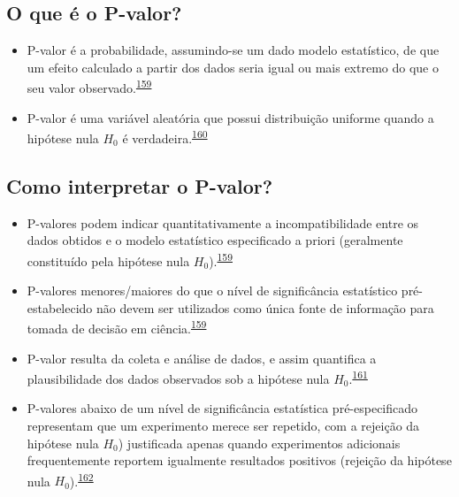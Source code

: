 \documentclass[
  a4paper,
]{book}
\begin{document}
\hypertarget{o-que-uxe9-o-p-valor}{%
\subsection{O que é o P-valor?}\label{o-que-uxe9-o-p-valor}}

\begin{itemize}
\item
  P-valor é a probabilidade, assumindo-se um dado modelo estatístico, de que um efeito calculado a partir dos dados seria igual ou mais extremo do que o seu valor observado.\textsuperscript{\protect\hyperlink{ref-wasserstein2016}{159}}
\item
  P-valor é uma variável aleatória que possui distribuição uniforme quando a hipótese nula \(H_{0}\) é verdadeira.\textsuperscript{\protect\hyperlink{ref-altman2017}{160}}
\end{itemize}

\hypertarget{como-interpretar-o-p-valor}{%
\subsection{Como interpretar o P-valor?}\label{como-interpretar-o-p-valor}}

\begin{itemize}
\item
  P-valores podem indicar quantitativamente a incompatibilidade entre os dados obtidos e o modelo estatístico especificado a priori (geralmente constituído pela hipótese nula \(H_{0}\)).\textsuperscript{\protect\hyperlink{ref-wasserstein2016}{159}}
\item
  P-valores menores/maiores do que o nível de significância estatístico pré-estabelecido não devem ser utilizados como única fonte de informação para tomada de decisão em ciência.\textsuperscript{\protect\hyperlink{ref-wasserstein2016}{159}}
\item
  P-valor resulta da coleta e análise de dados, e assim quantifica a plausibilidade dos dados observados sob a hipótese nula \(H_{0}\).\textsuperscript{\protect\hyperlink{ref-heinze2016}{161}}
\item
  P-valores abaixo de um nível de significância estatística pré-especificado representam que um experimento merece ser repetido, com a rejeição da hipótese nula \(H_{0}\)) justificada apenas quando experimentos adicionais frequentemente reportem igualmente resultados positivos (rejeição da hipótese nula \(H_{0}\)).\textsuperscript{\protect\hyperlink{ref-goodman2016}{162}}
\end{itemize}
\end{document}

